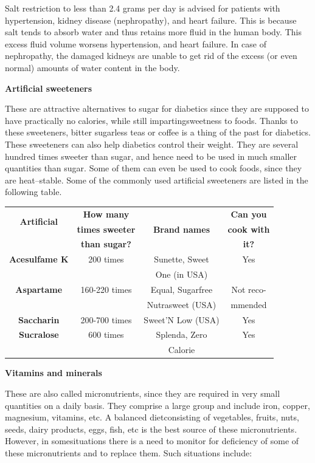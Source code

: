 Salt restriction to less than 2.4 grams per day is advised for patients with hypertension, kidney disease (nephropathy), and heart failure. This is because salt tends to absorb water and thus retains more fluid in the human body. This excess fluid volume worsens hypertension, and heart failure. In case of nephropathy, the damaged kidneys are unable to get rid of the excess (or even normal) amounts of water content in the body.

\noindent\textbf{Artificial sweeteners}

These are attractive alternatives to sugar for diabetics since they are supposed to have practically no calories, while still imparting\break sweetness to foods. Thanks to these sweeteners, bitter sugarless teas or coffee is a thing of the past for diabetics. These sweeteners can also help diabetics control their weight. They are several hundred times sweeter than sugar, and hence need to be used in much smaller quanti\-ties than sugar. Some of them can even be used to cook foods, since they are heat–stable. Some of the commonly used artificial sweete\-ners are listed in the following table.

{
\addtolength{\tabcolsep}{-5pt}
\begin{longtable}{|c|c|c|c|}
\hline
\multicolumn{1}{|c|}{\multirow{2}{1.6cm}{\textbf{Artificial}}} & \textbf{How many} &  & \textbf{Can you}\\
\multicolumn{1}{|c|}{\multirow{2}{1.6cm}{\textbf{Sweetener}}} & \textbf{times sweeter} & \textbf{Brand names} & \textbf{cook with}\\
 & \textbf{than sugar?} &  & \textbf{it?}\\
\hline
\textbf{Acesulfame K} & 200 times & Sunette, Sweet & Yes\\
 &  & One (in USA) & \\
\hline
\textbf{Aspartame} & 160-220 times & Equal, Sugarfree & Not reco-\\
 &  & Nutrasweet (USA) & mmended\\
\hline
\textbf{Saccharin} & 200-700 times & Sweet’N Low (USA) & Yes\\
\hline
\textbf{Sucralose} & 600 times & Splenda, Zero & Yes\\
 &  & Calorie & \\
\hline
\end{longtable}
}\relax

\noindent\textbf{Vitamins and minerals}

These are also called micronutrients, since they are required in very small quantities on a daily basis. They comprise a large group and include iron, copper, magnesium, vitamins, etc. A balanced diet\break consisting of vegetables, fruits, nuts, seeds, dairy products, eggs, fish, etc is the best source of these micronutrients. However, in some\break situations there is a need to monitor for deficiency of some of these micronutrients and to replace them. Such situations include:

